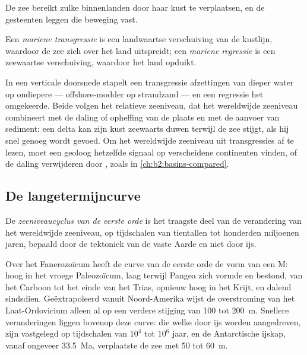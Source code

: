 De zee bereikt zulke binnenlanden door haar kust te verplaatsen, en de gesteenten leggen die beweging vast.

\begin{definition}\label{def:b2:phanerozoic-earth:transgression}
Een \emph{mariene transgressie} is een landwaartse verschuiving van de kustlijn,
waardoor de zee zich over het land uitspreidt; een \emph{mariene regressie} is
een zeewaartse verschuiving, waardoor het land opduikt.
\end{definition}

In een verticale doorsnede stapelt een transgressie afzettingen van dieper water op ondiepere ---
offshore-modder op strandzand --- en een regressie het omgekeerde. Beide volgen het relatieve
zeeniveau, dat het wereldwijde zeeniveau combineert met de daling of opheffing van de plaats en met de
aanvoer van sediment: een delta kan zijn kust zeewaarts duwen terwijl de zee stijgt, als hij snel genoeg
wordt gevoed. Om het wereldwijde zeeniveau uit transgressies af te lezen, moet een geoloog hetzelfde signaal
op verscheidene continenten vinden, of de daling verwijderen door , zoals in
\cref{ch:b2:basins-compared}.

\subsection*{De langetermijncurve}

\begin{definition}\label{def:b2:phanerozoic-earth:first-order}
De \emph{zeeniveaucyclus van de eerste orde} is het traagste deel van
de verandering van het wereldwijde zeeniveau, op tijdschalen van tientallen tot honderden miljoenen jaren, bepaald door
de tektoniek van de vaste Aarde en niet door ijs.
\end{definition}

Over het Fanerozoïcum heeft de curve van de eerste orde de vorm van een M: hoog in het vroege Paleozoïcum,
laag terwijl Pangea zich vormde en bestond, van het Carboon tot het einde van het Trias, opnieuw hoog
in het Krijt, en dalend sindsdien. Geëxtrapoleerd vanuit Noord-Amerika wijst de overstroming van het Laat-Ordovicium
alleen al op een verdere stijging van 100 tot \qty{200}{m}.
Snellere veranderingen liggen bovenop deze curve: die welke door ijs worden aangedreven, zijn vastgelegd op tijdschalen van $10^4$ tot
$10^6$ jaar, en de Antarctische ijskap, vanaf ongeveer \qty{33.5}{Ma}, verplaatste de zee met 50 tot
\qty{60}{m}.

